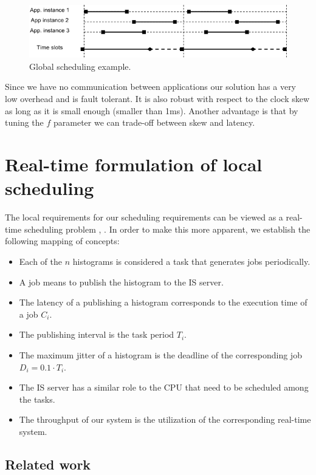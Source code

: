 \begin{figure}[ht!]
\centering
\includegraphics[scale=0.6]{Images/local_sched.png}
\caption{Global scheduling example.}
\label{fig:local_sched}
\end{figure}

Since we have no communication between applications our solution has a very low overhead and is fault tolerant. It is also robust with respect to the clock skew as long as it is small enough (smaller than 1ms). Another advantage is that by tuning the $f$ parameter we can trade-off between skew and latency. 

\section*{Real-time formulation of local scheduling}

The local requirements for our scheduling requirements can be viewed as a real-time scheduling problem \citep{liu1973scheduling}, \citep{sha2004real}. In order to make this more apparent, we establish the following mapping of concepts:
\begin{itemize}
\item Each of the $n$ histograms is considered a task that generates jobs periodically. 
\item A job means to publish the histogram to the IS server.
\item The latency of a publishing a histogram corresponds to the execution time of a job $C_i$.
\item The publishing interval is the task period $T_i$. 
\item The maximum jitter of a histogram is the deadline of the corresponding job $D_i=0.1\cdot T_i$.
\item The IS server has a similar role to the CPU that need to be scheduled among the tasks.
\item The throughput of our system is the utilization of the corresponding real-time system.
\end{itemize}

\subsection*{Related work}

